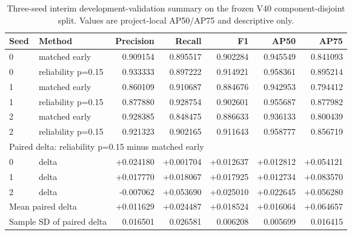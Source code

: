 \begin{table}[t]
\caption{Three-seed interim development-validation summary on the frozen V40 component-disjoint split. Values are project-local AP50/AP75 and descriptive only.}
\label{tab:v41-three-seed-interim-devval}
\centering
\small
\begin{tabular}{llrrrrr}
\hline
Seed & Method & Precision & Recall & F1 & AP50 & AP75 \\
\hline
0 & matched early & 0.909154 & 0.895517 & 0.902284 & 0.945549 & 0.841093 \\
0 & reliability p=0.15 & 0.933333 & 0.897222 & 0.914921 & 0.958361 & 0.895214 \\
1 & matched early & 0.860109 & 0.910687 & 0.884676 & 0.942953 & 0.794412 \\
1 & reliability p=0.15 & 0.877880 & 0.928754 & 0.902601 & 0.955687 & 0.877982 \\
2 & matched early & 0.928385 & 0.848475 & 0.886633 & 0.936133 & 0.800439 \\
2 & reliability p=0.15 & 0.921323 & 0.902165 & 0.911643 & 0.958777 & 0.856719 \\
\hline
\multicolumn{7}{l}{Paired delta: reliability p=0.15 minus matched early} \\
0 & delta & +0.024180 & +0.001704 & +0.012637 & +0.012812 & +0.054121 \\
1 & delta & +0.017770 & +0.018067 & +0.017925 & +0.012734 & +0.083570 \\
2 & delta & -0.007062 & +0.053690 & +0.025010 & +0.022645 & +0.056280 \\
\hline
\multicolumn{2}{l}{Mean paired delta} & +0.011629 & +0.024487 & +0.018524 & +0.016064 & +0.064657 \\
\multicolumn{2}{l}{Sample SD of paired delta} & 0.016501 & 0.026581 & 0.006208 & 0.005699 & 0.016415 \\
\hline
\end{tabular}
\end{table}
